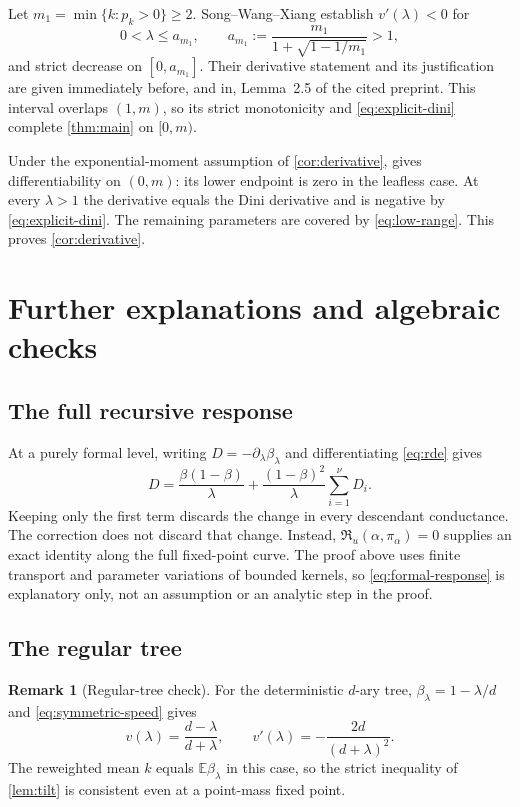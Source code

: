 \documentclass[11pt,a4paper]{article}
\numberwithin{equation}{section}
\theoremstyle{notethm}
\theoremstyle{definition}
\newtheorem{remark}[remark]{Remark}
\newcommand{\E}{\mathbb E}
\newcommand{\res}{\mathfrak R}
\begin{document}
Let $m_1=\min\{k:p_k>0\}\ge2$. Song--Wang--Xiang
\cite[Theorem~1.2 and Lemma~2.5]{SWX} establish $v'(\lambda)<0$ for
\begin{equation}\label{eq:low-range}
 0<\lambda\le a_{m_1},\qquad
 a_{m_1}:=\frac{m_1}{1+\sqrt{1-1/m_1}}>1,
\end{equation}
and strict decrease on $[0,a_{m_1}]$. Their derivative statement and its
justification are given immediately before, and in, Lemma~2.5 of the cited
preprint. This interval overlaps $(1,m)$, so its strict monotonicity and
\eqref{eq:explicit-dini} complete \cref{thm:main} on $[0,m)$.

Under the exponential-moment assumption of \cref{cor:derivative},
\cite[Theorem~1.1]{BT} gives differentiability on $(0,m)$: its lower endpoint
is zero in the leafless case. At every $\lambda>1$ the derivative equals the
Dini derivative and is negative by \eqref{eq:explicit-dini}. The remaining
parameters are covered by \eqref{eq:low-range}. This proves
\cref{cor:derivative}.

\appendix
\section{Further explanations and algebraic checks}\label{sec:appendix}

\subsection{The full recursive response}\label{sec:meaning}

At a purely formal level, writing $D=-\partial_\lambda\beta_\lambda$ and
differentiating \eqref{eq:rde} gives
\begin{equation}\label{eq:formal-response}
 D=\frac{\beta(1-\beta)}{\lambda}
    +\frac{(1-\beta)^2}{\lambda}\sum_{i=1}^{\nu}D_i.
\end{equation}
Keeping only the first term discards the change in every descendant
conductance. The correction does not discard that change. Instead,
$\res_u(\alpha,\pi_\alpha)=0$ supplies an exact identity along the full
fixed-point curve. The proof above uses finite transport and parameter
variations of bounded kernels, so \eqref{eq:formal-response} is explanatory
only, not an assumption or an analytic step in the proof.

\subsection{The regular tree}
\begin{remark}[Regular-tree check]\label{rem:regular}
For the deterministic $d$-ary tree, $\beta_\lambda=1-\lambda/d$ and
\eqref{eq:symmetric-speed} gives
\[
 v(\lambda)=\frac{d-\lambda}{d+\lambda},\qquad
 v'(\lambda)=-\frac{2d}{(d+\lambda)^2}.
\]
The reweighted mean $k$ equals $\E\beta_\lambda$ in this case, so the strict
inequality of \cref{lem:tilt} is consistent even at a point-mass fixed point.
\end{remark}
\end{document}
